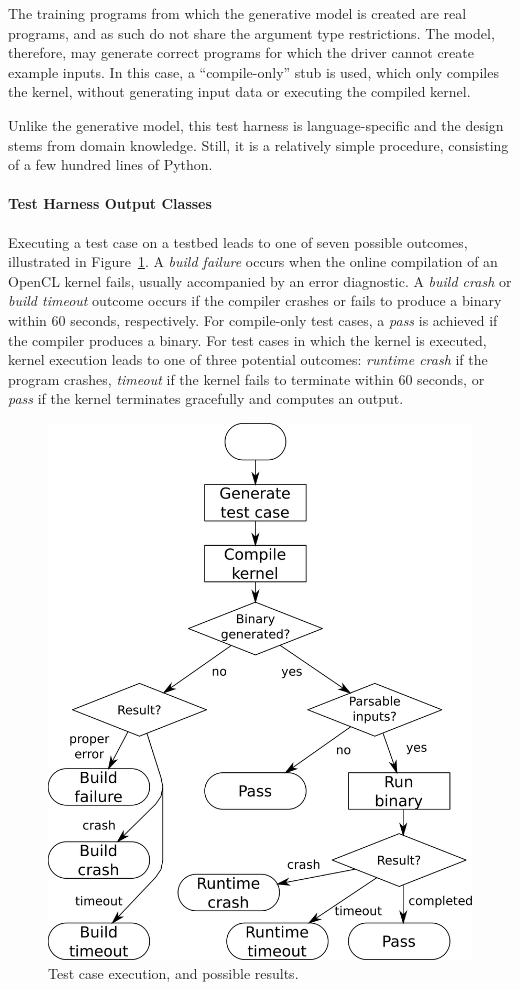 The training programs from which the generative model is created are real programs, and as such do not share the argument type restrictions. The model, therefore, may generate correct programs for which the driver cannot create example inputs. In this case, a ``compile-only'' stub is used, which only compiles the kernel, without generating input data or executing the compiled kernel.

Unlike the generative model, this test harness is language-specific and the design stems from domain knowledge. Still, it is a relatively simple procedure, consisting of a few hundred lines of Python.

\paragraph*{Test Harness Output Classes}

Executing a test case on a testbed leads to one of seven possible outcomes, illustrated in Figure~\ref{fig:test-process}. A \emph{build failure} occurs when the online compilation of an OpenCL kernel fails, usually accompanied by an error diagnostic. A \emph{build crash} or \emph{build timeout} outcome occurs if the compiler crashes or fails to produce a binary within 60 seconds, respectively. For compile-only test cases, a \emph{pass} is achieved if the compiler produces a binary. For test cases in which the kernel is executed, kernel execution leads to one of three potential outcomes: \emph{runtime crash} if the program crashes, \emph{timeout} if the kernel fails to terminate within 60 seconds, or \emph{pass} if the kernel terminates gracefully and computes an output.

\begin{figure}
  \centering %
  \includegraphics[width=.65\columnwidth]{img/testprocess-long}
  \caption[Test case execution, and possible results]{%
    Test case execution, and possible results.%
  }%
  \label{fig:test-process}
\end{figure}


